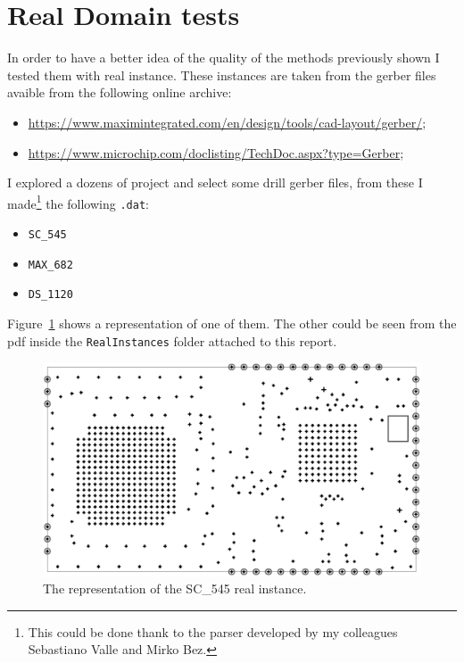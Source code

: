 \section{Real Domain tests}
\label{sec:realDomainTests}
	In order to have a better idea of the quality of the methods previously shown I tested them with real instance. These instances are taken from the gerber files avaible from the following online archive:
	\begin{itemize}
		\item \href{https://www.maximintegrated.com/en/design/tools/cad-layout/gerber/}{https://www.maximintegrated.com/en/design/tools/cad-layout/gerber/};
		\item \href{https://www.microchip.com/doclisting/TechDoc.aspx?type=Gerber}{https://www.microchip.com/doclisting/TechDoc.aspx?type=Gerber};
	\end{itemize}

	I explored a dozens of project and select some drill gerber files, from these I made\footnote{This could be done thank to the parser developed by my colleagues Sebastiano Valle and Mirko Bez.} the following \verb|.dat|:
	
	\begin{itemize}
		\item \verb|SC_545|
		\item \verb|MAX_682|
		\item \verb|DS_1120|
	\end{itemize}
	Figure~\ref{fig:SC_545} shows a representation of one of them. The other could be seen from the pdf inside the \verb|RealInstances| folder attached to this report.

	\begin{figure} [h]
		\centering
		\includegraphics[width=\textwidth]{img/SC_545}
		\caption{The representation of the SC\_545 real instance.}
		\label{fig:SC_545}
	\end{figure}
	
